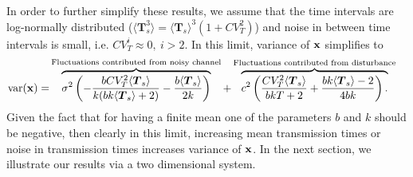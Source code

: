 \documentclass[letterpaper, 10 pt,one column, conference]{ieeeconf}  %
\begin{document}
In order to further simplify these results, we assume that the time intervals are log-normally distributed ($\langle \boldsymbol T_s^3 \rangle= \langle \boldsymbol T_s\rangle^3 (1+CV^2_T)$) and noise in between time intervals is small, i.e. $CV^i_T \approx 0, \ i>2$. In this limit, variance of $\bold x$ simplifies to 
\begin{equation}  \begin{aligned}
\text{var}(\bold x )= & \overbrace{\sigma^2 \left( -\frac{b CV^2_T \langle \boldsymbol T_s \rangle }{k (b k \langle \boldsymbol T_s \rangle +2)}-\frac{b \langle \boldsymbol T_s \rangle}{2 k}  \right)}^\text{Fluctuations contributed from noisy channel} +\overbrace{ c^2 \left( \frac{CV^2_T  \langle \boldsymbol T_s \rangle  }{b k T+2}+ \frac{b k  \langle \boldsymbol T_s \rangle  -2}{4 b k}  \right). }^\text{Fluctuations contributed from disturbance}
\end{aligned}
\end{equation}
Given the fact that for having a finite mean one of the parameters $b$ and $k$ should be negative, then clearly in this limit, increasing mean transmission times or noise in transmission times increases variance of $\bold x$. In the next section, we illustrate our results via a two dimensional system.
\end{document}
